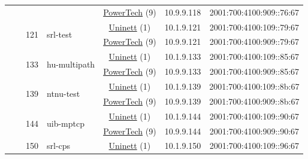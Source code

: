 \begin{small}
\begin{center}
\begin{longtable}{|c|c|c|c|c|c|c|c|}
  &  &  &  & \multicolumn{2}{|c|}{\tiny{\href{http://www.powertech.no}{PowerTech} (9)}} & \tiny{10.9.9.118} & \tiny{2001:700:4100:909::76:67} \\* \cline{3-3}\cline{4-4}\cline{5-5}\cline{6-6}\cline{7-7}\cline{8-8}
  &  & \multirow{2}{*}{\tiny{121}} & \multicolumn{1}{|l|}{\multirow{2}{*}{\tiny{srl-test}}} & \multicolumn{2}{|c|}{\tiny{\href{https://www.uninett.no}{Uninett} (1)}} & \tiny{10.1.9.121} & \tiny{2001:700:4100:109::79:67} \\* \cline{5-5}\cline{6-6}\cline{7-7}\cline{8-8}
  &  &  &  & \multicolumn{2}{|c|}{\tiny{\href{http://www.powertech.no}{PowerTech} (9)}} & \tiny{10.9.9.121} & \tiny{2001:700:4100:909::79:67} \\* \cline{3-3}\cline{4-4}\cline{5-5}\cline{6-6}\cline{7-7}\cline{8-8}
  &  & \multirow{2}{*}{\tiny{133}} & \multicolumn{1}{|l|}{\multirow{2}{*}{\tiny{hu-multipath}}} & \multicolumn{2}{|c|}{\tiny{\href{https://www.uninett.no}{Uninett} (1)}} & \tiny{10.1.9.133} & \tiny{2001:700:4100:109::85:67} \\* \cline{5-5}\cline{6-6}\cline{7-7}\cline{8-8}
  &  &  &  & \multicolumn{2}{|c|}{\tiny{\href{http://www.powertech.no}{PowerTech} (9)}} & \tiny{10.9.9.133} & \tiny{2001:700:4100:909::85:67} \\* \cline{3-3}\cline{4-4}\cline{5-5}\cline{6-6}\cline{7-7}\cline{8-8}
  &  & \multirow{2}{*}{\tiny{139}} & \multicolumn{1}{|l|}{\multirow{2}{*}{\tiny{ntnu-test}}} & \multicolumn{2}{|c|}{\tiny{\href{https://www.uninett.no}{Uninett} (1)}} & \tiny{10.1.9.139} & \tiny{2001:700:4100:109::8b:67} \\* \cline{5-5}\cline{6-6}\cline{7-7}\cline{8-8}
  &  &  &  & \multicolumn{2}{|c|}{\tiny{\href{http://www.powertech.no}{PowerTech} (9)}} & \tiny{10.9.9.139} & \tiny{2001:700:4100:909::8b:67} \\* \cline{3-3}\cline{4-4}\cline{5-5}\cline{6-6}\cline{7-7}\cline{8-8}
  &  & \multirow{2}{*}{\tiny{144}} & \multicolumn{1}{|l|}{\multirow{2}{*}{\tiny{uib-mptcp}}} & \multicolumn{2}{|c|}{\tiny{\href{https://www.uninett.no}{Uninett} (1)}} & \tiny{10.1.9.144} & \tiny{2001:700:4100:109::90:67} \\* \cline{5-5}\cline{6-6}\cline{7-7}\cline{8-8}
  &  &  &  & \multicolumn{2}{|c|}{\tiny{\href{http://www.powertech.no}{PowerTech} (9)}} & \tiny{10.9.9.144} & \tiny{2001:700:4100:909::90:67} \\* \cline{3-3}\cline{4-4}\cline{5-5}\cline{6-6}\cline{7-7}\cline{8-8}
  &  & \multirow{2}{*}{\tiny{150}} & \multicolumn{1}{|l|}{\multirow{2}{*}{\tiny{srl-cps}}} & \multicolumn{2}{|c|}{\tiny{\href{https://www.uninett.no}{Uninett} (1)}} & \tiny{10.1.9.150} & \tiny{2001:700:4100:109::96:67} \\* \cline{5-5}\cline{6-6}\cline{7-7}\cline{8-8}

\end{longtable}
\end{center}
\end{small}
